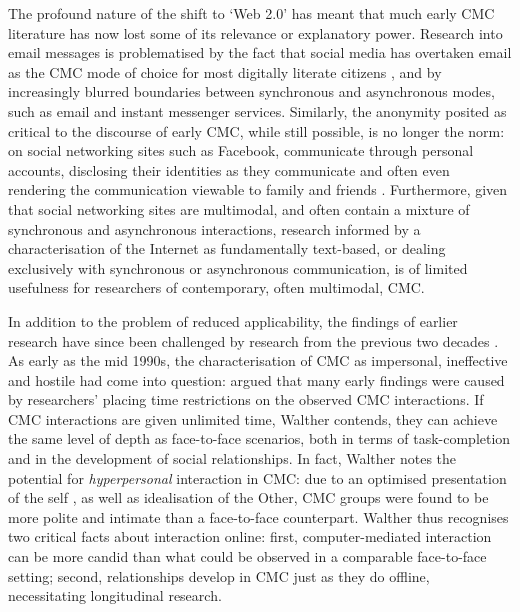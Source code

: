 The profound nature of the shift to `Web 2.0' has meant that much early \gls{CMC} literature has now lost some of its relevance or explanatory power. Research into email messages is problematised by the fact that social media has overtaken email as the \gls{CMC} mode of choice for most digitally literate citizens \cite{thorne_computer-mediated_2008}, and by increasingly blurred boundaries between synchronous and asynchronous \glspl{mode}, such as email and instant messenger services. Similarly, the anonymity posited as critical to the discourse of early \gls{CMC}, while still possible, is no longer the norm: on social networking sites such as Facebook,  communicate through personal accounts, disclosing their identities as they communicate and often even rendering the communication viewable to family and friends \cite{boyd_social_2007}. Furthermore, given that social networking sites are multimodal, and often contain a mixture of synchronous and asynchronous interactions, research informed by a characterisation of the Internet as fundamentally text\hyp{}based, or dealing exclusively with synchronous or asynchronous communication, is of limited usefulness for researchers of contemporary, often multimodal, \gls{CMC}.

In addition to the problem of reduced applicability, the findings of earlier research have since been challenged by research from the previous two decades \cite{herring_computer-mediated_2001,postmes_formation_2000}. As early as the mid 1990s, the characterisation of \gls{CMC} as impersonal, ineffective and hostile had come into question: \textcite{walther_computer-mediated_1996} argued that many early findings were caused by researchers' placing time restrictions on the observed \gls{CMC} interactions. If \gls{CMC} interactions are given unlimited time, Walther contends, they can achieve the same level of depth as face\hyp{}to\hyp{}face scenarios, both in terms of task\hyp{}completion and in the development of social relationships. In fact, Walther notes the potential for \emph{hyperpersonal} interaction in CMC: due to an optimised presentation of the self \cite[now often called \emph{self\hyp{}curation}; see][]{van_kleek_self_2015}, as well as idealisation of the Other, \gls{CMC} groups were found to be more polite and intimate than a face\hyp{}to\hyp{}face counterpart. Walther thus recognises two critical facts about interaction online: first, computer\hyp{}mediated interaction can be more candid than what could be observed in a comparable face\hyp{}to\hyp{}face setting; second, relationships develop in \gls{CMC} just as they do offline, necessitating longitudinal research. 

